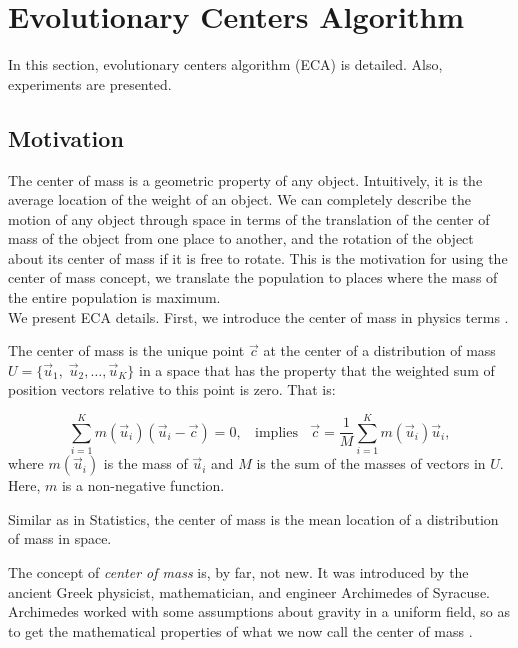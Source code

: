 \documentclass{svproc}
\begin{document}
\section{Evolutionary Centers Algorithm} %

In this section, evolutionary centers algorithm (ECA) is detailed. Also, 
experiments are presented.

\label{sec:eca}
%
%
\subsection{Motivation} %
The center of mass is a geometric property of any object. Intuitively, it is the 
average location of the weight of an object. We can completely describe the motion 
of any object through space in terms of the translation of the center of mass of 
the object from one place to another, and the rotation of the object about its 
center of mass if it is free to rotate. This is the motivation for using the center of mass
concept, we translate the population to places where the mass of the entire population is
maximum.\\

We present ECA details. First, we introduce the center of mass in physics 
terms \cite{kleppner73,serway}.

\begin{definition}
	The center of mass is the unique point $\vec{c}$ at the center of a distribution
	of mass $U = \{\vec{u}_1,\; \vec{u}_2 , \ldots , \vec{u}_K \}$ in a space that 
	has the property that the weighted sum of position vectors relative to this point 
	is zero. That is:

	\begin{equation}
		\sum_{i = 1}^K m(\vec{u}_i) (\vec{u}_i - \vec{c}) = 0, \;\; \text{ implies } \;\; 
		\vec{c} = \dfrac{1}{M} \sum_{i = 1}^K  m(\vec{u}_i)  \vec{u}_i,
		\label{eq:masscenter}
	\end{equation}
	where $m(\vec{u}_i)$ is the mass of $\vec{u}_i$ and  $M$ is the sum of the 
	masses of vectors in $U$. Here, $m$ is a non-negative function.
\end{definition}
%
%
\begin{note}
Similar as in Statistics, the center of mass is the mean location of a distribution 
of mass in space.
\end{note}
% 
The concept of \textit{center of mass} is, by far, not new. It was introduced by the ancient 
Greek physicist, mathematician, and engineer Archimedes of Syracuse. Archimedes 
worked with some assumptions about gravity in a uniform field, so as to 
get the mathematical properties of what we now call the center of mass \cite{kleppner73}.\\
\end{document}
